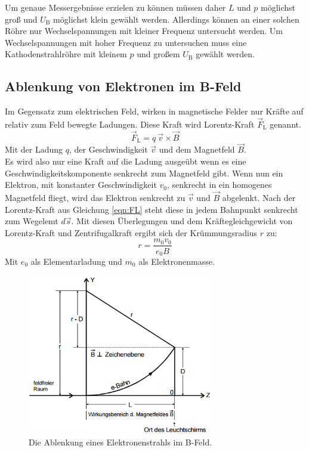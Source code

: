 Um genaue Messergebnisse erzielen zu können müssen daher $L$ und $p$ möglichst groß und $U_\text{B}$ möglichst klein gewählt werden. Allerdings können an einer solchen Röhre nur Wechselspannungen mit kleiner Frequenz untersucht werden. Um Wechselspannungen mit hoher Frequenz zu untersuchen muss eine Kathodenstrahlröhre mit kleinem $p$ und großem $U_\text{B}$ gewählt werden.

\subsection{Ablenkung von Elektronen im B-Feld}
Im Gegensatz zum elektrischen Feld, wirken in magnetische Felder nur Kräfte auf relativ zum Feld bewegte Ladungen. Diese Kraft wird Lorentz-Kraft $\vec{F}_\text{L}$ genannt.
\begin{equation}
	\vec{F}_\text{L} = q \ \vec{v} \times \vec{B}
	\label{eqn:FL}
\end{equation}
Mit der Ladung $q$, der Geschwindigkeit $\vec{v}$ und dem Magnetfeld $\vec{B}$.\\
Es wird also nur eine Kraft auf die Ladung ausgeübt wenn es eine Geschwindigkeitskomponente senkrecht zum Magnetfeld gibt. Wenn nun ein Elektron, mit konstanter Geschwindigkeit $v_0$, senkrecht in ein homogenes Magnetfeld fliegt, wird das Elektron senkrecht zu $\vec{v}$ und $\vec{B}$ abgelenkt. Nach der Lorentz-Kraft aus Gleichung \eqref{eqn:FL} steht diese in jedem Bahnpunkt senkrecht zum Wegelemt $d \vec{s}$. Mit diesen Überlegungen und dem Kräftegleichgewicht von Lorentz-Kraft und Zentrifugalkraft ergibt sich der Krümmungsradius $r$ zu:
\begin{equation}
	r = \frac{m_0 v_0}{e_0 B}
	\label{eqn:r}
\end{equation}
Mit $e_0$ als Elementarladung und $m_0$ als Elektronenmasse. \\

\begin{figure}[H]
	\centering
	\includegraphics[height=7cm]{picture/AblenkungBFeld}
	\caption{Die Ablenkung eines Elektronenstrahls im B-Feld. \cite[2]{V502}}
	\label{fig:AblenkungB}
\end{figure}


